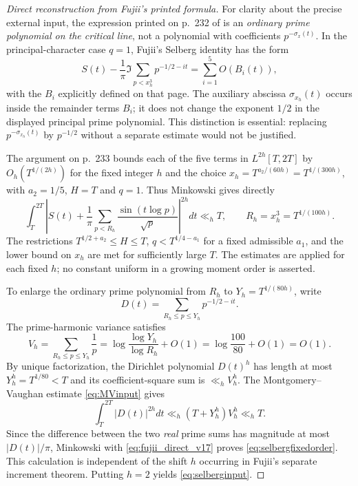 \documentclass[11pt,reqno]{amsart}
\numberwithin{equation}{section}
\begin{document}
\begin{proof}[Direct reconstruction from Fujii's printed formula]
For clarity about the precise external input, the expression printed
on p.~232 of \cite{Fujii1974} is an \emph{ordinary prime polynomial
on the critical line}, not a polynomial with coefficients
$p^{-\sigma_x(t)}$.  In the principal-character case $q=1$, Fujii's
Selberg identity has the form
\[
 S(t)-\frac1\pi\Im\sum_{p<x_h^3}p^{-1/2-it}
     =\sum_{i=1}^{5} O(B_i(t)),
\]
with the $B_i$ explicitly defined on that page. The auxiliary
abscissa $\sigma_{x_h}(t)$ occurs inside the remainder terms $B_i$;
it does not change the exponent $1/2$ in the displayed principal
prime polynomial.  This distinction is essential: replacing
$p^{-\sigma_{x_h}(t)}$ by $p^{-1/2}$ without a separate estimate
would not be justified.

The argument on p.~233 bounds each of the five terms in
$L^{2h}[T,2T]$ by $O_h(T^{1/(2h)})$ for the fixed
integer $h$ and the choice
$x_h=T^{a_2/(60h)}=T^{1/(300h)}$, with $a_2=1/5$,
$H=T$ and $q=1$. Thus Minkowski gives directly
\begin{equation}\label{eq:fujii_direct_v17}
 \int_T^{2T}\left|S(t)+\frac1\pi
  \sum_{p<R_h}\frac{\sin(t\log p)}{\sqrt p}\right|^{2h}dt
   \ll_h T,\qquad R_h=x_h^3=T^{1/(100h)}.
\end{equation}
The restrictions $T^{1/2+a_2}\le H\le T$,
$q<T^{1/4-a_1}$ for a fixed admissible $a_1$, and the
lower bound on $x_h$ are met for sufficiently large $T$.
The estimates are applied for each fixed $h$; no constant
uniform in a growing moment order is asserted.

To enlarge the ordinary prime polynomial from $R_h$ to
$Y_h=T^{1/(80h)}$, write
\[
D(t)=\sum_{R_h\le p\le Y_h}p^{-1/2-it}.
\]
The prime-harmonic variance satisfies
\[
 V_h=\sum_{R_h\le p\le Y_h}\frac1p
 =\log\frac{\log Y_h}{\log R_h}+O(1)
 =\log\frac{100}{80}+O(1)=O(1).
\]
By unique factorization, the Dirichlet polynomial $D(t)^h$
has length at most $Y_h^h=T^{1/80}<T$ and
its coefficient-square sum is $\ll_h V_h^h$.
The Montgomery--Vaughan estimate \eqref{eq:MVinput} gives
\[
 \int_T^{2T}|D(t)|^{2h}dt
 \ll_h (T+Y_h^h) V_h^h\ll_h T.
\]
Since the difference between the two \emph{real} prime sums
has magnitude at most $|D(t)|/\pi$, Minkowski with
\eqref{eq:fujii_direct_v17} proves
\eqref{eq:selbergfixedorder}. This calculation is independent
of the shift $h$ occurring in Fujii's separate increment theorem.
Putting $h=2$ yields \eqref{eq:selberginput}.
\end{proof}
\end{document}
